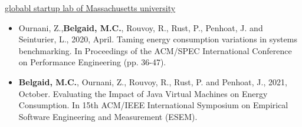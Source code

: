 \documentclass[10pt,a4paper,ragged2e,withhyper]{altacv}
\begin{document}
\begin{paracol}{2}
  \divider

  \href{https://gsl.mit.edu/mit-global-startup-labs}{globabl startup lab of Massachusetts university}

  \medskip


  \medskip

  \divider


  \divider





  \medskip


  \divider

  \divider


  \switchcolumn
  \medskip


  \medskip

  \begin{itemize}
    \item  Ournani, Z.,\textbf{Belgaid, M.C.}, Rouvoy, R., Rust, P., Penhoat, J. and Seinturier, L., 2020, April. Taming energy consumption variations in systems benchmarking. In Proceedings of the ACM/SPEC International Conference on Performance Engineering (pp. 36-47).
          \medskip
    \item  \textbf{Belgaid, M.C.}, Ournani, Z., Rouvoy, R., Rust, P. and Penhoat, J., 2021, October. Evaluating the Impact of Java Virtual Machines on Energy Consumption. In 15th ACM/IEEE International Symposium on Empirical Software Engineering and Measurement (ESEM).

  \end{itemize}


\end{paracol}
\end{document}
